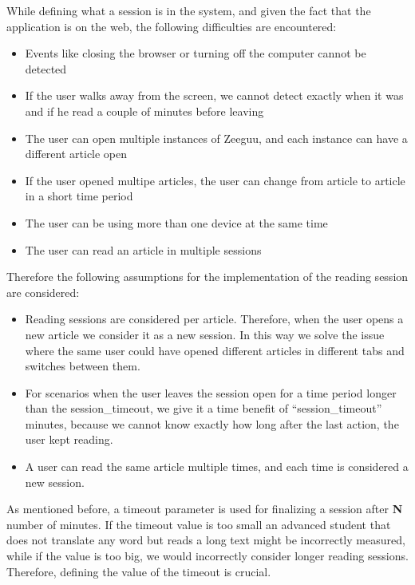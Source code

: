 While defining what a session is in the system, and given the fact that the application is on the web, the following difficulties are encountered:
\begin{itemize}
	\item Events like closing the browser or turning off the computer cannot be detected
	\item If the user walks away from the screen, we cannot detect exactly when it was and if he read a couple of minutes before leaving
	\item The user can open multiple instances of Zeeguu, and each instance can have a different article open
	\item If the user opened multipe articles, the user can change from article to article in a short time period
	\item The user can be using more than one device at the same time
	\item The user can read an article in multiple sessions
\end{itemize}

Therefore the following assumptions for the implementation of the reading session are considered:
\begin{itemize}
\item Reading sessions are considered per article. Therefore, when the user opens a new article we consider it as a new session. In this way we solve the issue where the same user could have opened different articles in different tabs and switches between them.

\item For scenarios when the user leaves the session open for a time period longer than the session\_timeout, we give it a time benefit of “session\_timeout” minutes, because we cannot know exactly how long after the last action, the user kept reading. 

\item A user can read the same article multiple times, and each time is considered a new session.
\end{itemize}

As mentioned before, a timeout parameter is used for finalizing a session after \textbf{N} number of minutes. If the timeout value is too small an advanced student that does not translate any word but reads a long text might be incorrectly measured, while if the value is too big, we would incorrectly consider longer reading sessions. Therefore, defining the value of the timeout is crucial. 


